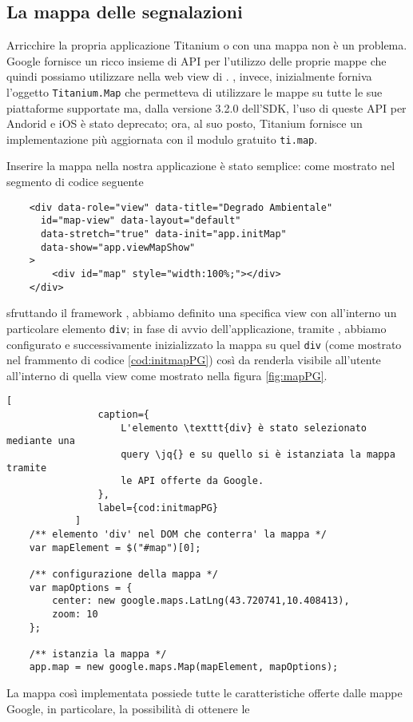 			
		\subsection{La mappa delle segnalazioni}
			Arricchire la propria applicazione Titanium o \pg{} con una mappa
			non è un problema. Google fornisce un ricco insieme di API \js{} per
			l'utilizzo delle proprie mappe che quindi possiamo utilizzare nella
			web view di \pg{}. \tisdk, invece, inizialmente forniva l'oggetto
			\texttt{Titanium.Map} che permetteva di utilizzare le mappe su tutte
			le sue piattaforme supportate ma, dalla versione 3.2.0 dell'SDK, l'uso
			di queste API per Andorid e iOS è stato deprecato; ora, al suo posto,
			Titanium fornisce un implementazione più aggiornata con	il modulo
			gratuito \texttt{ti.map}.
			
			Inserire la mappa nella nostra applicazione \pg{} è stato semplice:
			come mostrato nel segmento di codice seguente
			\begin{lstlisting}
	<div data-role="view" data-title="Degrado Ambientale"
	  id="map-view" data-layout="default"
	  data-stretch="true" data-init="app.initMap"
	  data-show="app.viewMapShow"
	>
		<div id="map" style="width:100%;"></div>
	</div>
			\end{lstlisting}
			sfruttando il framework \kendomob{}, abbiamo definito una specifica
			view con all'interno un particolare elemento \texttt{div}; in fase di
			avvio dell'applicazione, tramite \js{}, abbiamo configurato e
			successivamente inizializzato la mappa su quel \texttt{div} (come
			mostrato nel frammento di codice \ref{cod:initmapPG}) così
			da renderla visibile all'utente all'interno di quella view come
			mostrato nella figura \ref{fig:mapPG}.
			\begin{lstlisting}[
				caption={
				    L'elemento \texttt{div} è stato selezionato mediante una
				    query \jq{} e su quello si è istanziata la mappa tramite
				    le API offerte da Google.
				},
				label={cod:initmapPG}
			]
	/** elemento 'div' nel DOM che conterra' la mappa */
	var mapElement = $("#map")[0];

	/** configurazione della mappa */
	var mapOptions = {
		center: new google.maps.LatLng(43.720741,10.408413),
		zoom: 10
	};

	/** istanzia la mappa */
	app.map = new google.maps.Map(mapElement, mapOptions);
			\end{lstlisting}
			La mappa così implementata possiede tutte le caratteristiche offerte
			dalle mappe Google, in particolare, la possibilità di ottenere le
